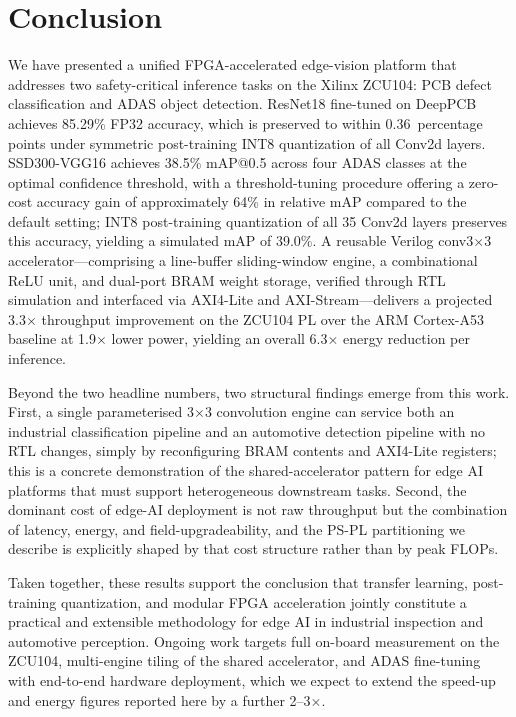 \documentclass[conference]{IEEEtran}
\begin{document}
\section{Conclusion}
\label{sec:conclusion}

We have presented a unified FPGA-accelerated edge-vision platform that addresses two safety-critical inference tasks on the Xilinx ZCU104: PCB defect classification and ADAS object detection. ResNet18 fine-tuned on DeepPCB achieves 85.29\% FP32 accuracy, which is preserved to within 0.36~percentage points under symmetric post-training INT8 quantization of all Conv2d layers. SSD300-VGG16 achieves 38.5\% mAP@0.5 across four ADAS classes at the optimal confidence threshold, with a threshold-tuning procedure offering a zero-cost accuracy gain of approximately 64\% in relative mAP compared to the default setting; INT8 post-training quantization of all 35 Conv2d layers preserves this accuracy, yielding a simulated mAP of 39.0\%. A reusable Verilog conv3$\times$3 accelerator---comprising a line-buffer sliding-window engine, a combinational ReLU unit, and dual-port BRAM weight storage, verified through RTL simulation and interfaced via AXI4-Lite and AXI-Stream---delivers a projected 3.3$\times$ throughput improvement on the ZCU104 PL over the ARM Cortex-A53 baseline at 1.9$\times$ lower power, yielding an overall 6.3$\times$ energy reduction per inference.

Beyond the two headline numbers, two structural findings emerge from this work. First, a single parameterised 3$\times$3 convolution engine can service both an industrial classification pipeline and an automotive detection pipeline with no RTL changes, simply by reconfiguring BRAM contents and AXI4-Lite registers; this is a concrete demonstration of the shared-accelerator pattern for edge AI platforms that must support heterogeneous downstream tasks. Second, the dominant cost of edge-AI deployment is not raw throughput but the combination of latency, energy, and field-upgradeability, and the PS-PL partitioning we describe is explicitly shaped by that cost structure rather than by peak FLOPs.

Taken together, these results support the conclusion that transfer learning, post-training quantization, and modular FPGA acceleration jointly constitute a practical and extensible methodology for edge AI in industrial inspection and automotive perception. Ongoing work targets full on-board measurement on the ZCU104, multi-engine tiling of the shared accelerator, and ADAS fine-tuning with end-to-end hardware deployment, which we expect to extend the speed-up and energy figures reported here by a further 2--3$\times$.
\end{document}
